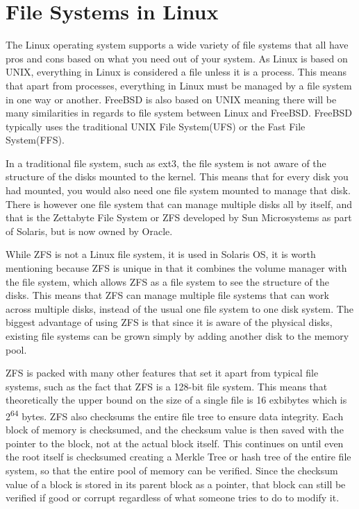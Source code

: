 \documentclass[10pt,serif,draftclsnofoot,onecolumn]{IEEEtran}
\begin{document}
	\section{File Systems in Linux}
	\par
			The Linux operating system supports a wide variety of file systems that all have pros and cons based on what you need out of your system. As Linux is based on UNIX, everything in Linux is considered a file unless it is a process. This means that apart from processes, everything in Linux must be managed by a file system in one way or another. FreeBSD is also based on UNIX meaning there will be many similarities in regards to file system between Linux and FreeBSD. FreeBSD typically uses the traditional UNIX File System(UFS) or the Fast File System(FFS)\cite{5}.
	\newline
	\par
			In a traditional file system, such as ext3, the file system is not aware of the structure of the disks mounted to the kernel. This means that for every disk you had mounted, you would also need one file system mounted to manage that disk. There is however one file system that can manage multiple disks all by itself, and that is the Zettabyte File System or ZFS developed by Sun Microsystems as part of Solaris, but is now owned by Oracle.\newline
		\par
			While ZFS is not a Linux file system, it is used in Solaris OS, it is worth mentioning because ZFS is unique in that it combines the volume manager with the file system, which allows ZFS as a file system to see the structure of the disks\cite{4}. This means that ZFS can manage multiple file systems that can work across multiple disks, instead of the usual one file system to one disk system. The biggest advantage of using ZFS is that since it is aware of the physical disks, existing file systems can be grown simply by adding another disk to the memory pool\cite{4}.
	\newline
	\par
			ZFS is packed with many other features that set it apart from typical file systems, such as the fact that ZFS is a 128-bit file system. This means that theoretically the upper bound on the size of a single file is 16 exbibytes which is 2\textsuperscript{64} bytes\cite{4}. ZFS also checksums the entire file tree to ensure data integrity. Each block of memory is checksumed, and the checksum value is then saved with the pointer to the block, not at the actual block itself. This continues on until even the root itself is checksumed creating a Merkle Tree or hash tree of the entire file system, so that the entire pool of memory can be verified. Since the checksum value of a block is stored in its parent block as a pointer, that block can still be verified if good or corrupt regardless of what someone tries to do to modify it\cite{4}.
	\newline
\end{document}
